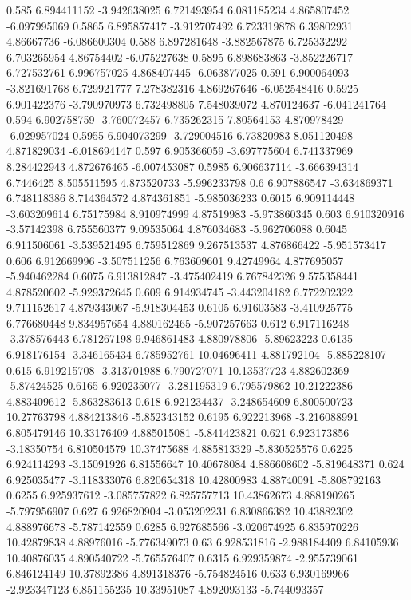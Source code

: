 {0.585 6.894411152 -3.942638025 6.721493954 6.081185234 4.865807452 -6.097995069
0.5865 6.895857417 -3.912707492 6.723319878 6.39802931 4.86667736 -6.086600304
0.588 6.897281648 -3.882567875 6.725332292 6.703265954 4.86754402 -6.075227638
0.5895 6.898683863 -3.852226717 6.727532761 6.996757025 4.868407445 -6.063877025
0.591 6.900064093 -3.821691768 6.729921777 7.278382316 4.869267646 -6.052548416
0.5925 6.901422376 -3.790970973 6.732498805 7.548039072 4.870124637 -6.041241764
0.594 6.902758759 -3.760072457 6.735262315 7.80564153 4.870978429 -6.029957024
0.5955 6.904073299 -3.729004516 6.73820983 8.051120498 4.871829034 -6.018694147
0.597 6.905366059 -3.697775604 6.741337969 8.284422943 4.872676465 -6.007453087
0.5985 6.906637114 -3.666394314 6.7446425 8.505511595 4.873520733 -5.996233798
0.6 6.907886547 -3.634869371 6.748118386 8.714364572 4.874361851 -5.985036233
0.6015 6.909114448 -3.603209614 6.75175984 8.910974999 4.87519983 -5.973860345
0.603 6.910320916 -3.57142398 6.755560377 9.09535064 4.876034683 -5.962706088
0.6045 6.911506061 -3.539521495 6.759512869 9.267513537 4.876866422 -5.951573417
0.606 6.912669996 -3.507511256 6.763609601 9.42749964 4.877695057 -5.940462284
0.6075 6.913812847 -3.475402419 6.767842326 9.575358441 4.878520602 -5.929372645
0.609 6.914934745 -3.443204182 6.772202322 9.711152617 4.879343067 -5.918304453
0.6105 6.91603583 -3.410925775 6.776680448 9.834957654 4.880162465 -5.907257663
0.612 6.917116248 -3.378576443 6.781267198 9.946861483 4.880978806 -5.89623223
0.6135 6.918176154 -3.346165434 6.785952761 10.04696411 4.881792104 -5.885228107
0.615 6.919215708 -3.313701988 6.790727071 10.13537723 4.882602369 -5.87424525
0.6165 6.920235077 -3.281195319 6.795579862 10.21222386 4.883409612 -5.863283613
0.618 6.921234437 -3.248654609 6.800500723 10.27763798 4.884213846 -5.852343152
0.6195 6.922213968 -3.216088991 6.805479146 10.33176409 4.885015081 -5.841423821
0.621 6.923173856 -3.18350754 6.810504579 10.37475688 4.885813329 -5.830525576
0.6225 6.924114293 -3.15091926 6.81556647 10.40678084 4.886608602 -5.819648371
0.624 6.925035477 -3.118333076 6.820654318 10.42800983 4.88740091 -5.808792163
0.6255 6.925937612 -3.085757822 6.825757713 10.43862673 4.888190265 -5.797956907
0.627 6.926820904 -3.053202231 6.830866382 10.43882302 4.888976678 -5.787142559
0.6285 6.927685566 -3.020674925 6.835970226 10.42879838 4.88976016 -5.776349073
0.63 6.928531816 -2.988184409 6.84105936 10.40876035 4.890540722 -5.765576407
0.6315 6.929359874 -2.955739061 6.846124149 10.37892386 4.891318376 -5.754824516
0.633 6.930169966 -2.923347123 6.851155235 10.33951087 4.892093133 -5.744093357
}
